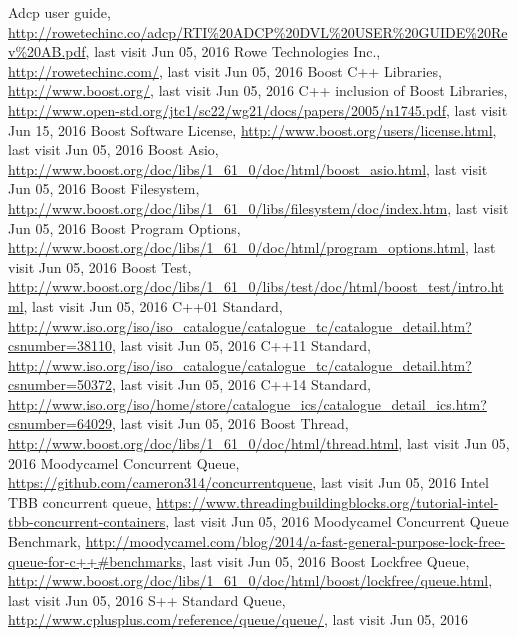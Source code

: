 \begin{thebibliography}{99}

Adcp user guide, \url{http://rowetechinc.co/adcp/RTI%20ADCP%20DVL%20USER%20GUIDE%20Rev%20AB.pdf}, last visit Jun 05, 2016
Rowe Technologies Inc., \url{http://rowetechinc.com/}, last visit Jun 05, 2016
 Boost C++ Libraries, \url{http://www.boost.org/}, last visit Jun 05, 2016
 C++ inclusion of Boost Libraries, \url{http://www.open-std.org/jtc1/sc22/wg21/docs/papers/2005/n1745.pdf}, last visit Jun 15, 2016
 Boost Software License, \url{http://www.boost.org/users/license.html}, last visit Jun 05, 2016
 Boost Asio, \url{http://www.boost.org/doc/libs/1\_61\_0/doc/html/boost\_asio.html}, last visit Jun 05, 2016
 Boost Filesystem, \url{http://www.boost.org/doc/libs/1\_61\_0/libs/filesystem/doc/index.htm}, last visit Jun 05, 2016
 Boost Program Options, \url{http://www.boost.org/doc/libs/1\_61\_0/doc/html/program\_options.html}, last visit Jun 05, 2016
 Boost Test, \url{http://www.boost.org/doc/libs/1\_61\_0/libs/test/doc/html/boost\_test/intro.html}, last visit Jun 05, 2016
C++01 Standard, \url{http://www.iso.org/iso/iso_catalogue/catalogue_tc/catalogue_detail.htm?csnumber=38110}, last visit Jun 05, 2016
C++11 Standard, \url{http://www.iso.org/iso/iso_catalogue/catalogue_tc/catalogue_detail.htm?csnumber=50372}, last visit Jun 05, 2016
C++14 Standard, \url{http://www.iso.org/iso/home/store/catalogue_ics/catalogue_detail_ics.htm?csnumber=64029}, last visit Jun 05, 2016
 Boost Thread, \url{http://www.boost.org/doc/libs/1\_61\_0/doc/html/thread.html}, last visit Jun 05, 2016
 Moodycamel Concurrent Queue, \url{https://github.com/cameron314/concurrentqueue}, last visit Jun 05, 2016
 Intel TBB concurrent queue, \url{https://www.threadingbuildingblocks.org/tutorial-intel-tbb-concurrent-containers}, last visit Jun 05, 2016
 Moodycamel Concurrent Queue Benchmark, \url{http://moodycamel.com/blog/2014/a-fast-general-purpose-lock-free-queue-for-c++#benchmarks}, last visit Jun 05, 2016
 Boost Lockfree Queue, \url{http://www.boost.org/doc/libs/1_61_0/doc/html/boost/lockfree/queue.html}, last visit Jun 05, 2016
 S++ Standard Queue, \url{http://www.cplusplus.com/reference/queue/queue/}, last visit Jun 05, 2016

\end{thebibliography}
